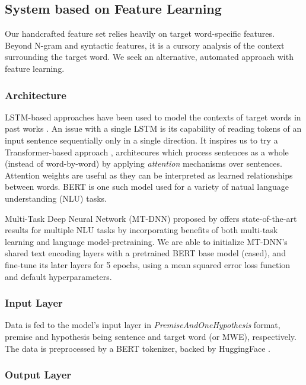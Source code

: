 \documentclass[11pt,a4paper]{article}
\begin{document}
\subsection{System based on Feature Learning}

Our handcrafted feature set relies heavily on target word-specific features. Beyond N-gram and syntactic features, it is a cursory analysis of the context surrounding the target word. We seek an alternative, automated approach with feature learning.

\subsubsection{Architecture}

LSTM-based approaches have been used to model the contexts of target words in past works \citep{hartmanndossantos2018nilc, dehertogtack2018deep}. An issue with a single LSTM is its capability of reading tokens of an input sentence sequentially only in a single direction. It inspires us to try a Transformer-based approach \citep{DBLP:journals/corr/VaswaniSPUJGKP17}, architecures which process sentences as a whole (instead of word-by-word) by applying \textit{attention} mechanisms over sentences. Attention weights are useful as they can be interpreted as learned relationships between words. BERT \citep{DBLP:journals/corr/abs-1810-04805} is one such model used for a variety of natual language understanding (NLU) tasks.

Multi-Task Deep Neural Network (MT-DNN) proposed by \citet{liuetal2019multitask} offers state-of-the-art results for multiple NLU tasks by incorporating benefits of both multi-task learning and language model-pretraining. We are able to initialize MT-DNN's shared text encoding layers with a pretrained BERT base model (cased), and fine-tune its later layers for 5 epochs, using a mean squared error loss function and default hyperparameters.

\subsubsection{Input Layer}

Data is fed to the model's input layer in \textit{PremiseAndOneHypothesis} format, premise and hypothesis being sentence and target word (or MWE), respectively. The data is preprocessed by a BERT tokenizer, backed by HuggingFace \citep{wolf_etal_2020_transformers}.

\subsubsection{Output Layer}
\end{document}
